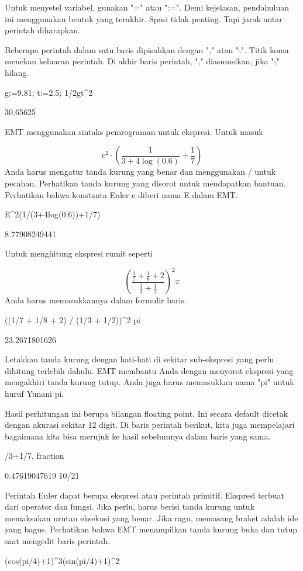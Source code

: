 \documentclass{article}
\begin{document}
Untuk menyetel variabel, gunakan "=" atau ":=". Demi kejelasan,
pendahuluan ini menggunakan bentuk yang terakhir. Spasi tidak penting.
Tapi jarak antar perintah diharapkan.


Beberapa perintah dalam satu baris dipisahkan dengan "," atau ";".
Titik koma menekan keluaran perintah. Di akhir baris perintah, ","
diasumsikan, jika ";" hilang.


\>g:=9.81; t:=2.5; 1/2\*g\*t^2


    30.65625

EMT menggunakan sintaks pemrograman untuk ekspresi. Untuk masuk


$$e^2 \cdot \left( \frac{1}{3+4 \log(0.6)}+\frac{1}{7} \right)$$Anda harus mengatur tanda kurung yang benar dan menggunakan / untuk
pecahan. Perhatikan tanda kurung yang disorot untuk mendapatkan
bantuan. Perhatikan bahwa konstanta Euler e diberi nama E dalam EMT.


\>E^2\*(1/(3+4\*log(0.6))+1/7)


    8.77908249441

Untuk menghitung ekspresi rumit seperti


$$\left(\frac{\frac17 + \frac18 + 2}{\frac13 + \frac12}\right)^2 \pi$$Anda harus memasukkannya dalam formulir baris.


\>((1/7 + 1/8 + 2) / (1/3 + 1/2))^2 \* pi


    23.2671801626

Letakkan tanda kurung dengan hati-hati di sekitar sub-ekspresi yang
perlu dihitung terlebih dahulu. EMT membantu Anda dengan menyorot
ekspresi yang mengakhiri tanda kurung tutup. Anda juga harus
memasukkan nama "pi" untuk huruf Yunani pi.


Hasil perhitungan ini berupa bilangan floating point. Ini secara
default dicetak dengan akurasi sekitar 12 digit. Di baris perintah
berikut, kita juga mempelajari bagaimana kita bisa merujuk ke hasil
sebelumnya dalam baris yang sama.


/3+1/7, fraction %


    0.47619047619
    10/21

Perintah Euler dapat berupa ekspresi atau perintah primitif. Ekspresi
terbuat dari operator dan fungsi. Jika perlu, harus berisi tanda
kurung untuk memaksakan urutan eksekusi yang benar. Jika ragu,
memasang braket adalah ide yang bagus. Perhatikan bahwa EMT
menampilkan tanda kurung buka dan tutup saat mengedit baris perintah.


\>(cos(pi/4)+1)^3\*(sin(pi/4)+1)^2
\end{document}
